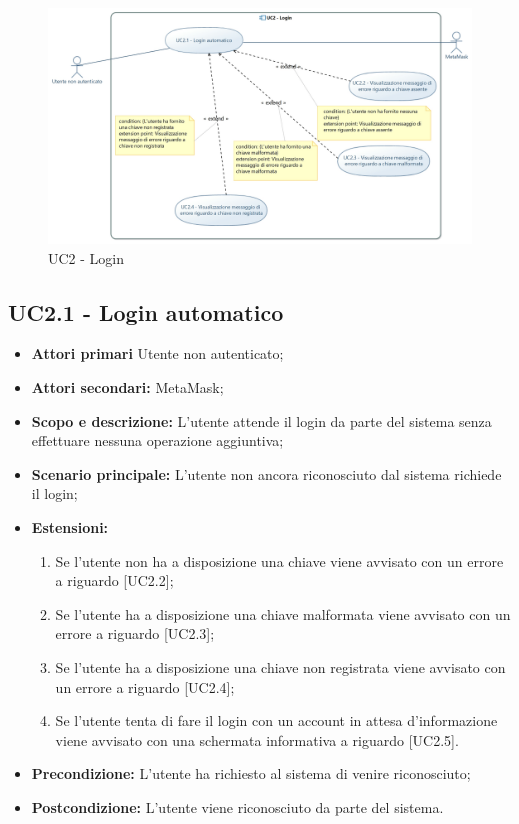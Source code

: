 \documentclass[AnalisiDeiRequisiti.tex]{subfiles}
\begin{document}
\begin{figure}[H]
	\centering
	\includegraphics[width=1.0\linewidth]{UC2.jpg}
	\caption{UC2 - Login}
	\label{fig:UC2 - Login}
\end{figure}

\subsection{UC2.1 - Login automatico}
\begin{itemize}
\item \textbf{Attori primari} Utente non autenticato;\\
\item \textbf{Attori secondari:} MetaMask;\\
\item \textbf{Scopo e descrizione:} L'utente attende il login da parte del sistema senza effettuare nessuna operazione aggiuntiva;\\
\item \textbf{Scenario principale:} L'utente non ancora riconosciuto dal sistema richiede il login;\\
\item \textbf{Estensioni:}\\
\begin{enumerate}
	\item Se l'utente non ha a disposizione una chiave viene avvisato con un errore a riguardo [UC2.2];
	\item Se l'utente ha a disposizione una chiave malformata viene avvisato con un errore a riguardo [UC2.3];
	\item Se l'utente ha a disposizione una chiave non registrata viene avvisato con un errore a riguardo [UC2.4];
	\item Se l'utente tenta di fare il login con un account in attesa d'informazione viene avvisato con una schermata informativa a riguardo [UC2.5].
\end{enumerate}
\item \textbf{Precondizione:} L'utente ha richiesto al sistema di venire riconosciuto;\\
\item \textbf{Postcondizione:} L'utente viene riconosciuto da parte del sistema.\\
\end{itemize}
\end{document}
